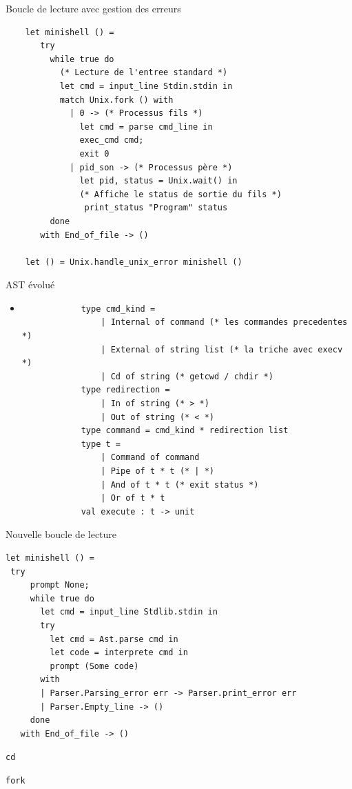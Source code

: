 \begin{frame}[fragile]{Boucle de lecture avec gestion des erreurs}
\begin{lstlisting}
    let minishell () =
       try
         while true do
           (* Lecture de l'entree standard *)
           let cmd = input_line Stdin.stdin in
           match Unix.fork () with
             | 0 -> (* Processus fils *)
               let cmd = parse cmd_line in
               exec_cmd cmd;
               exit 0
             | pid_son -> (* Processus père *)
               let pid, status = Unix.wait() in
               (* Affiche le status de sortie du fils *)
                print_status "Program" status
         done
       with End_of_file -> ()

    let () = Unix.handle_unix_error minishell ()
\end{lstlisting}
\end{frame}

\begin{frame}[fragile]{AST évolué}
    \begin{itemize}[leftmargin=-10pt]
         \item
        \begin{lstlisting}
            type cmd_kind =
                | Internal of command (* les commandes precedentes *)
                | External of string list (* la triche avec execv *)
                | Cd of string (* getcwd / chdir *)
            type redirection =
                | In of string (* > *)
                | Out of string (* < *)
            type command = cmd_kind * redirection list
            type t =
                | Command of command
                | Pipe of t * t (* | *)
                | And of t * t (* exit status *)
                | Or of t * t
            val execute : t -> unit
        \end{lstlisting}
    \end{itemize}
\end{frame}

\begin{frame}[fragile]{Nouvelle boucle de lecture}
\begin{lstlisting}
let minishell () =
 try
     prompt None;
     while true do
       let cmd = input_line Stdlib.stdin in
       try
         let cmd = Ast.parse cmd in
         let code = interprete cmd in
         prompt (Some code)
       with
       | Parser.Parsing_error err -> Parser.print_error err
       | Parser.Empty_line -> ()
     done
   with End_of_file -> ()
\end{lstlisting}
\end{frame}

\begin{frame}{}

\end{frame}

\begin{frame}{\texttt{cd}}

\end{frame}

\begin{frame}{\texttt{fork}}

\end{frame}
